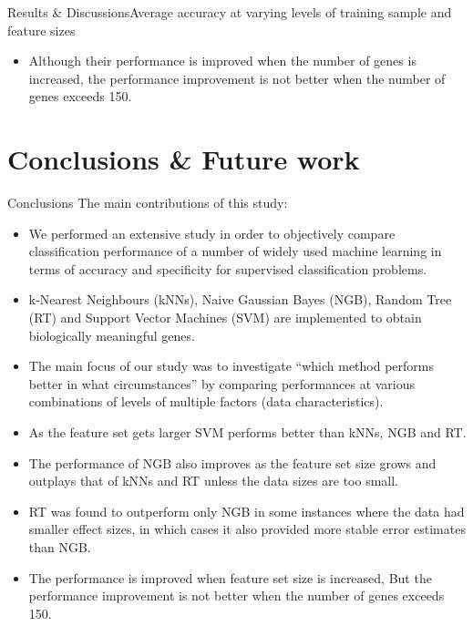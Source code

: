 \documentclass[xcolor=table]{beamer}
\numberwithin{figure}{section}
\numberwithin{equation}{section}
\begin{document}
\begin{frame}{Results \& Discussions}{Average accuracy at varying levels of training sample and feature sizes}
\begin{figure}
\begin{subfigure}
\end{subfigure}
\end{figure}    
\begin{itemize}
    \item \footnotesize{Although their performance is improved when the number of genes is increased, the performance improvement is not better when the number of genes exceeds 150.}
\end{itemize}
\end{frame}
\section{Conclusions \& Future work}
\begin{frame}[allowframebreaks]{Conclusions}
  The main contributions of this study:
\begin{itemize}
    \item We performed an extensive study in order to objectively compare classification performance of a number of widely used machine learning in terms of accuracy and specificity for supervised classification   problems.
    \item k-Nearest Neighbours (kNNs), Naive Gaussian Bayes (NGB), Random Tree (RT) and Support Vector Machines (SVM) are implemented to obtain biologically meaningful genes.
    \item The main focus of our study was to investigate ``which method performs better in what circumstances'' by comparing performances at various combinations of levels of multiple factors (data characteristics).
\end{itemize}
\framebreak
  \begin{itemize}
    \item As the feature set gets larger SVM performs better than kNNs, NGB and RT.
    \item The performance of NGB also improves as the feature set size grows and outplays that of kNNs and RT unless the data sizes are too small.
    \item RT was found to outperform only NGB in some instances where the data had smaller effect sizes, in which cases it also provided more stable error estimates than NGB.
    \item The performance is improved when feature set size is increased, But the performance improvement is not better when the number of genes exceeds 150.
  \end{itemize}

\end{frame}
\end{document}
